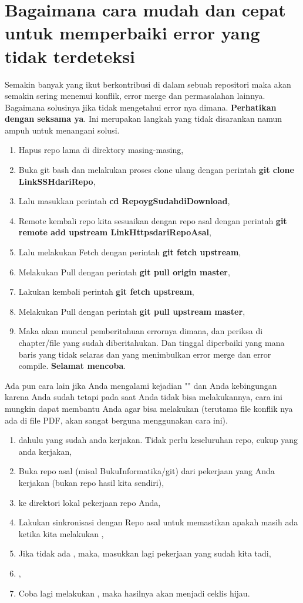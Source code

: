 \section{Bagaimana cara mudah dan cepat untuk memperbaiki error yang tidak terdeteksi}
Semakin banyak yang ikut berkontribusi di dalam sebuah repositori maka akan semakin sering menemui konflik, error merge dan permasalahan lainnya. Bagaimana solusinya jika tidak mengetahui error nya dimana. \textbf{Perhatikan dengan seksama ya}. Ini merupakan langkah yang tidak disarankan namun ampuh untuk menangani solusi.
\begin{enumerate}
\item Hapus repo lama di direktory masing-masing,
\item Buka git bash dan melakukan proses clone ulang dengan perintah \textbf{git clone LinkSSHdariRepo},
\item Lalu masukkan perintah \textbf{cd RepoygSudahdiDownload},
\item Remote kembali repo kita sesuaikan dengan repo asal dengan perintah \textbf{git remote add upstream LinkHttpsdariRepoAsal},
\item Lalu melakukan Fetch dengan perintah \textbf{git fetch upstream},
\item Melakukan Pull dengan perintah \textbf{git pull origin master},
\item Lakukan kembali perintah \textbf{git fetch upstream},
\item Melakukan Pull dengan perintah \textbf{git pull upstream master},
\item Maka akan muncul pemberitahuan errornya dimana, dan periksa di chapter/file yang sudah diberitahukan. Dan tinggal diperbaiki yang mana baris yang tidak selaras dan yang menimbulkan error merge dan error compile. \textbf{Selamat mencoba}.
\end{enumerate}
Ada pun cara lain jika Anda mengalami kejadian "" dan Anda kebingungan karena Anda sudah  tetapi pada saat  Anda tidak bisa melakukannya, cara ini mungkin dapat membantu Anda agar bisa melakukan  (terutama file konflik nya ada di file PDF, akan sangat berguna menggunakan cara ini).
\begin{enumerate}
\item {} dahulu yang sudah anda kerjakan. Tidak perlu  keseluruhan repo, cukup  yang anda kerjakan,
\item Buka repo asal (misal BukuInformatika/git) dari pekerjaan yang Anda kerjakan (bukan repo hasil  kita sendiri),
\item {} ke direktori lokal pekerjaan repo Anda,
\item Lakukan sinkronisasi dengan Repo asal untuk memastikan apakah masih ada  ketika kita melakukan ,
\item Jika tidak ada , maka, masukkan lagi pekerjaan yang sudah kita  tadi,
\item {},
\item Coba lagi melakukan , maka hasilnya akan menjadi ceklis hijau.
\end{enumerate}